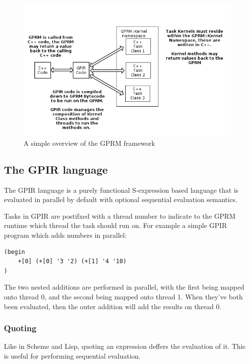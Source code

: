 \begin{figure}[ht]
\begin{center}
\includegraphics{graphs/gprm.png}
\caption{A simple overview of the GPRM framework}
\end{center}
\end{figure}

\subsection{The GPIR language}

The GPIR language is a purely functional S-expression based language that is evaluated in parallel by default 
with optional sequential evaluation semantics.

Tasks in GPIR are postifxed with a thread number to indicate to the GPRM runtime which thread
the task should run on. For example a simple GPIR program which adds numbers in parallel:

\begin{lstlisting}[style=myGPC]
(begin
    +[0] (+[0] '3 '2) (+[1] '4 '10)
)
\end{lstlisting}

The two nested additions are performed in parallel, with the first being mapped onto thread 0,
and the second being mapped onto thread 1. When they've both been evaluated, then the outer addition
will add the results on thread 0.

\subsubsection{Quoting}

Like in Scheme and Lisp, quoting an expression deffers the evaluation of it. 
This is useful for performing sequential evaluation.


